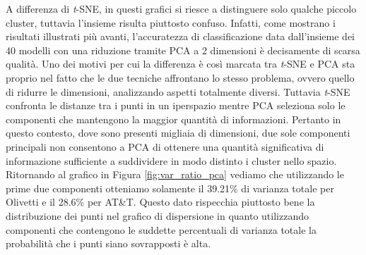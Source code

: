 \documentclass[12pt,italian]{report}
\begin{document}
A differenza di \emph{t}-SNE, in questi grafici si riesce a distinguere solo qualche piccolo cluster, tuttavia l'insieme risulta piuttosto confuso. Infatti, come mostrano i risultati illustrati più avanti, l'accuratezza di classificazione data dall'insieme dei 40 modelli con una riduzione tramite PCA a 2 dimensioni è decisamente di scarsa qualità. Uno dei motivi per cui la differenza è così marcata tra \emph{t}-SNE e PCA sta proprio nel fatto che le due tecniche affrontano lo stesso problema, ovvero quello di ridurre le dimensioni, analizzando aspetti totalmente diversi. 
Tuttavia \emph{t}-SNE confronta le distanze tra i punti in un iperspazio mentre PCA seleziona solo le componenti che mantengono la maggior quantità di informazioni. Pertanto in questo contesto, dove sono presenti migliaia di dimensioni, due sole componenti principali non consentono a PCA di ottenere una quantità significativa di informazione sufficiente a suddividere in modo distinto i cluster nello spazio. Ritornando al grafico in Figura \ref{fig:var_ratio_pca} vediamo che utilizzando le prime due componenti otteniamo solamente il 39.21\% di varianza totale per Olivetti e il 28.6\% per AT\&T. Questo dato rispecchia piuttosto bene la distribuzione dei punti nel grafico di dispersione in quanto utilizzando componenti che contengono le suddette percentuali di varianza totale la probabilità che i punti siano sovrapposti è alta. 
\end{document}
